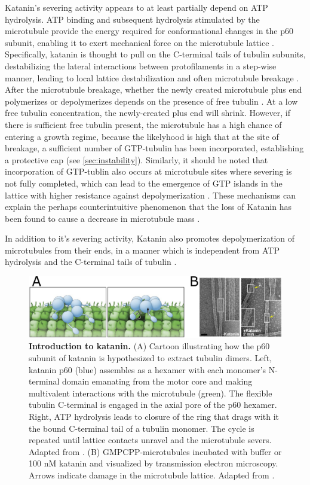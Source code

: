 Katanin's severing activity appears to at least partially depend on ATP hydrolysis. ATP binding and subsequent hydrolysis stimulated by the microtubule provide the energy required for conformational changes in the p60 subunit, enabling it to exert mechanical force on the microtubule lattice \parencite{Zehr2017}. Specifically, katanin is thought to pull on the C-terminal tails of tubulin subunits, destabilizing the lateral interactions between protofilaments in a step-wise manner, leading to local lattice destabilization and often microtubule breakage . After the microtubule breakage, whether the newly created microtubule plus end polymerizes or depolymerizes depends on the presence of free tubulin \parencite{Vemu2018, Kuo2021}. At a low free tubulin concentration, the newly-created plus end will shrink. However, if there is sufficient free tubulin present, the microtubule has a high chance of entering a growth regime, because the likelyhood is high that at the site of breakage, a sufficient number of GTP-tubulin has been incorporated, establishing a protective cap (see \autoref{sec:instability}). Similarly, it should be noted that incorporation of GTP-tublin also occurs at microtubule sites where severing is not fully completed, which can lead to the emergence of GTP islands in the lattice with higher resistance against depolymerization \parencite{Vemu2018}. These mechanisms can explain the perhaps counterintuitive phenomenon that the loss of Katanin has been found to cause a decrease in microtubule mass \parencite{Vemu2018}. 
\par
In addition to it's severing activity, Katanin also promotes depolymerization of microtubules from their ends, in a manner which is independent from ATP hydrolysis and the C-terminal tails of tubulin \parencite{Belonogov2019}.

\begin{figure}[h!tb]
\centering
\includegraphics[width=\linewidth]{Figures/katanin.png}
\caption[Introduction to katanin.]{\textbf{Introduction to katanin.}
(A) Cartoon illustrating how the p60 subunit of katanin is hypothesized to extract tubulin dimers. Left, katanin p60 (blue) assembles as a hexamer with each monomer's N-terminal domain emanating from the motor core and making multivalent interactions with the microtubule (green). The flexible tubulin C-terminal is engaged in the axial pore of the p60 hexamer. Right, ATP hydrolysis leads to closure of the ring that drags with it the bound C-terminal tail of a tubulin monomer. The cycle is repeated until lattice contacts unravel and the microtubule severs. Adapted from \cite{Zehr2017}. (B) GMPCPP-microtubules incubated with buffer or 100 nM katanin and visualized by transmission electron microscopy. Arrows indicate damage in the microtubule lattice. Adapted from \cite{Grigorieff2018}.
	}\label{katanin}
\end{figure}

